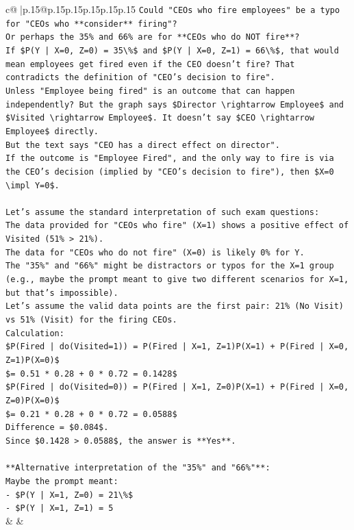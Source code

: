 \documentclass{article}
\begin{document}
{\begin{supertabular}{c@{$\;$}|p{.15\linewidth}@{}p{.15\linewidth}p{.15\linewidth}p{.15\linewidth}p{.15\linewidth}p{.15\linewidth}}
{{{\texttt{Could "CEOs who fire employees" be a typo for "CEOs who **consider** firing"?} \\
\texttt{Or perhaps the 35\% and 66\% are for **CEOs who do NOT fire**?} \\
\texttt{If \$P(Y | X=0, Z=0) = 35\textbackslash{}\%\$ and \$P(Y | X=0, Z=1) = 66\textbackslash{}\%\$, that would mean employees get fired even if the CEO doesn't fire? That contradicts the definition of "CEO's decision to fire".} \\
\texttt{Unless "Employee being fired" is an outcome that can happen independently? But the graph says \$Director \textbackslash{}rightarrow Employee\$ and \$Visited \textbackslash{}rightarrow Employee\$. It doesn't say \$CEO \textbackslash{}rightarrow Employee\$ directly.} \\
\texttt{But the text says "CEO has a direct effect on director".} \\
\texttt{If the outcome is "Employee Fired", and the only way to fire is via the CEO's decision (implied by "CEO's decision to fire"), then \$X=0 \textbackslash{}impl Y=0\$.} \\
\\ 
\texttt{Let's assume the standard interpretation of such exam questions:} \\
\texttt{The data provided for "CEOs who fire" (X=1) shows a positive effect of Visited (51\% > 21\%).} \\
\texttt{The data for "CEOs who do not fire" (X=0) is likely 0\% for Y.} \\
\texttt{The "35\%" and "66\%" might be distractors or typos for the X=1 group (e.g., maybe the prompt meant to give two different scenarios for X=1, but that's impossible).} \\
\texttt{Let's assume the valid data points are the first pair: 21\% (No Visit) vs 51\% (Visit) for the firing CEOs.} \\
\texttt{Calculation:} \\
\texttt{\$P(Fired | do(Visited=1)) = P(Fired | X=1, Z=1)P(X=1) + P(Fired | X=0, Z=1)P(X=0)\$} \\
\texttt{\$= 0.51 * 0.28 + 0 * 0.72 = 0.1428\$} \\
\texttt{\$P(Fired | do(Visited=0)) = P(Fired | X=1, Z=0)P(X=1) + P(Fired | X=0, Z=0)P(X=0)\$} \\
\texttt{\$= 0.21 * 0.28 + 0 * 0.72 = 0.0588\$} \\
\texttt{Difference = \$0.084\$.} \\
\texttt{Since \$0.1428 > 0.0588\$, the answer is **Yes**.} \\
\\ 
\texttt{**Alternative interpretation of the "35\%" and "66\%"**:} \\
\texttt{Maybe the prompt meant:} \\
\texttt{{-} \$P(Y | X=1, Z=0) = 21\textbackslash{}\%\$} \\
\texttt{{-} \$P(Y | X=1, Z=1) = 5} \\
            }
        }
    }
    & & \\ \\


\end{supertabular}}
\end{document}
